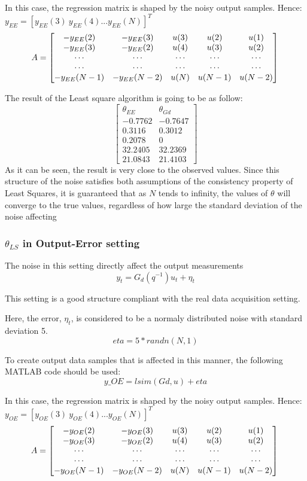 In this case, the regression matrix is shaped by the noisy output samples. Hence:
\(y_{EE} = [y_{EE}(3) \: y_{EE}(4) ... y_{EE}(N)]^T 
\)
\[
    A = \left[
    \begin{matrix}
    -y_{EE}(2) & -y_{EE}(3) & u(3) & u(2) & u(1) \\
    -y_{EE}(3) & -y_{EE}(2) & u(4) & u(3) & u(2) \\
    \cdots & \cdots & \cdots & \cdots & \cdots   \\
    \cdots & \cdots & \cdots & \cdots & \cdots   \\
    -y_{EE}(N-1) & -y_{EE}(N-2) & u(N) & u(N-1) & u(N-2)
    \end{matrix} 
    \right]\\
\]

The result of the Least square algorithm is going to be as follow:
\[
\begin{bmatrix}
    \theta_{EE} & \theta_{Gd} \\
    -0.7762 & -0.7647 \\
     0.3116 & 0.3012 \\
     0.2078 & 0 \\
    32.2405 & 32.2369 \\
    21.0843 & 21.4103
\end{bmatrix}
\]
As it can be seen, the result is very close to the observed values. Since this structure of the noise satisfies both assumptions of the consistency property of Least Squares, it is guaranteed that as \(N\) tends to infinity, the values of \(\theta\) will converge to the true values, regardless of how large the standard deviation of the noise affecting

\subsubsection{\(\theta_{LS}\) in Output-Error setting}
The noise in this setting directly affect the output measurements
\[
y_t = G_d(q^{-1})u_t + \eta_t
\]
\begin{QandAbox}
This setting is a good structure compliant with the real data acquisition setting.
\end{QandAbox}
Here, the error, \(\eta_t\), is considered to be a normaly distributed noise with standard deviation 5.
\[
eta = 5 * randn(N,1)
\]

To create output data samples that is affected in this manner, the following MATLAB code should be used:
\[
y\_OE = lsim(Gd,u) + eta
\]

In this case, the regression matrix is shaped by the noisy output samples. Hence:
\(y_{OE} = [y_{OE}(3) \: y_{OE}(4) ... y_{OE}(N)]^T 
\)
\[
    A = \left[
    \begin{matrix}
    -y_{OE}(2) & -y_{OE}(3) & u(3) & u(2) & u(1) \\
    -y_{OE}(3) & -y_{OE}(2) & u(4) & u(3) & u(2) \\
    \cdots & \cdots & \cdots & \cdots & \cdots   \\
    \cdots & \cdots & \cdots & \cdots & \cdots   \\
    -y_{OE}(N-1) & -y_{OE}(N-2) & u(N) & u(N-1) & u(N-2)
    \end{matrix} 
    \right]\\
\]

